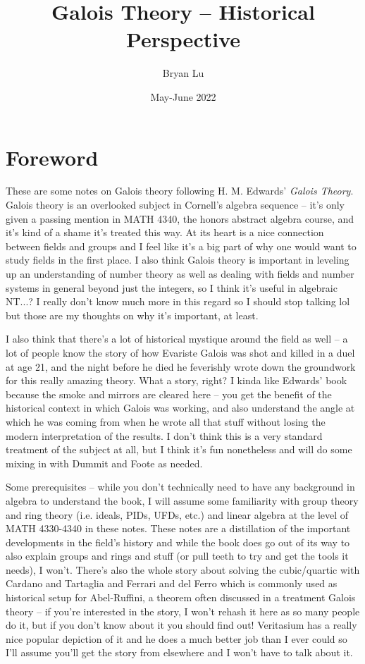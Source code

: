 \documentclass[12pt]{scrartcl}
\title{Galois Theory -- Historical Perspective}
\author{Bryan Lu}
\date{May-June 2022} %
\begin{document}
\maketitle

\setcounter{section}{-1}
\section{Foreword}
These are some notes on Galois theory following H. M. Edwards' \textit{Galois Theory}. Galois theory is an overlooked subject in Cornell's algebra sequence -- it's only given a passing mention in MATH 4340, the honors abstract algebra course, and it's kind of a shame it's treated this way. At its heart is a nice connection between fields and groups and I feel like it's a big part of why one would want to study fields in the first place. I also think Galois theory is important in leveling up an understanding of number theory as well as dealing with fields and number systems in general beyond just the integers, so I think it's useful in algebraic NT...? I really don't know much more in this regard so I should stop talking lol but those are my thoughts on why it's important, at least.

I also think that there's a lot of historical mystique around the field as well -- a lot of people know the story of how Evariste Galois was shot and killed in a duel at age 21, and the night before he died he feverishly wrote down the groundwork for this really amazing theory. What a story, right? I kinda like Edwards' book because the smoke and mirrors are cleared here -- you get the benefit of the historical context in which Galois was working, and also understand the angle at which he was coming from when he wrote all that stuff without losing the modern interpretation of the results. I don't think this is a very standard treatment of the subject at all, but I think it's fun nonetheless and will do some mixing in with Dummit and Foote as needed.

Some prerequisites -- while you don't technically need to have any background in algebra to understand the book, I will assume some familiarity with group theory and ring theory (i.e. ideals, PIDs, UFDs, etc.) and linear algebra at the level of MATH 4330-4340 in these notes. These notes are a distillation of the important developments in the field's history and while the book does go out of its way to also explain groups and rings and stuff (or pull teeth to try and get the tools it needs), I won't. There's also the whole story about solving the cubic/quartic with Cardano and Tartaglia and Ferrari and del Ferro which is commonly used as historical setup for Abel-Ruffini, a theorem often discussed in a treatment Galois theory -- if you're interested in the story, I won't rehash it here as so many people do it, but if you don't know about it you should find out! Veritasium has a really nice popular depiction of it and he does a much better job than I ever could so I'll assume you'll get the story from elsewhere and I won't have to talk about it.
\end{document}
